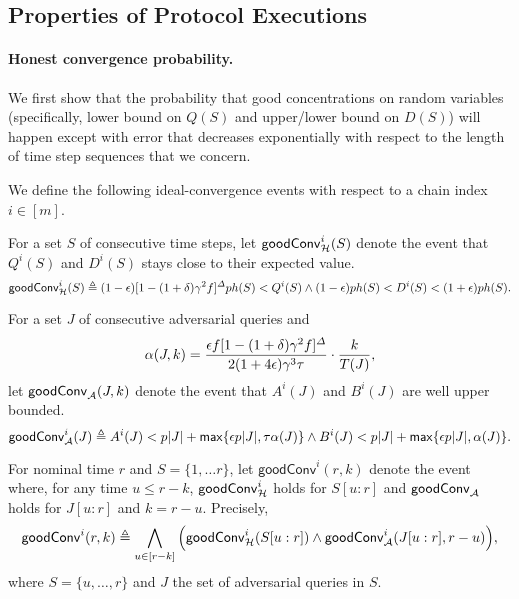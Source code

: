\subsection{Properties of Protocol Executions}
\label{subsec:properties-of-protocol-executions}

\paragraph{Honest convergence probability.}
%
We first show that the probability that good concentrations on random variables (specifically, lower bound on $Q(S)$ and upper/lower bound on $D(S)$) will happen except with error that decreases exponentially with respect to the length of time step sequences that we concern.

\begin{definition}
    \label{def:ideal-conv-events}

    We define the following ideal-convergence events with respect to a chain index $i \in [m]$.
    \begin{cccItemize}[noitemsep]
        \item For a set $S$ of consecutive time steps, let $\mathsf{goodConv}^i_{\mathcal{H}}(S)$ denote the event that $Q^i(S)$ and $D^i(S)$ stays close to their expected value.
        \[ \mathsf{goodConv}^i_{\mathcal{H}}(S) \triangleq (1 - \epsilon)[1 - (1 + \delta)\gamma^2 f]^{\varDelta} p h(S) < Q^i(S) \wedge (1 - \epsilon) p h(S) < D^i(S) < (1 + \epsilon) p h(S). \]

        \item For a set $J$ of consecutive adversarial queries and
        \begin{equation} \label{eq:alpha-j-k}
            \alpha(J, k) = \frac{\epsilon f [1 - (1 + \delta) \gamma^2 f]^{\varDelta}}{2 (1 + 4\epsilon) \gamma^3 \tau} \cdot  \frac{k}{T(J)},
        \end{equation}
        let $\mathsf{goodConv}_{\mathcal{A}}(J, k)$ denote the event that $A^i(J)$ and $B^i(J)$ are well upper bounded.
        \[ \mathsf{goodConv}^i_{\mathcal{A}}(J) \triangleq A^i(J) < p|J| + \mathsf{max} \{ \epsilon p|J|, \tau \alpha(J) \} \wedge B^i(J) < p|J| + \mathsf{max} \{ \epsilon p|J|, \alpha(J) \}. \]

        \item  For nominal time $r$ and $S = \{1, \ldots r\}$, let $\mathsf{goodConv}^i(r, k)$ denote the event where, for any time $u \le r - k$, $\mathsf{goodConv}^i_{\mathcal{H}}$ holds for $S[u : r]$ and $\mathsf{goodConv}_{\mathcal{A}}$ holds for $J[u : r]$ and $k = r - u$.
        Precisely,
        \[ \mathsf{goodConv}^i(r, k) \triangleq \bigwedge_{u \in [r - k]} \Big( \mathsf{goodConv}^i_{\mathcal{H}}(S[u : r]) \wedge \mathsf{goodConv}^i_{\mathcal{A}}(J[u : r], r - u) \Big), \]
        where $S = \{u, \ldots, r\}$ and $J$ the set of adversarial queries in $S$.
    \end{cccItemize}
\end{definition}

